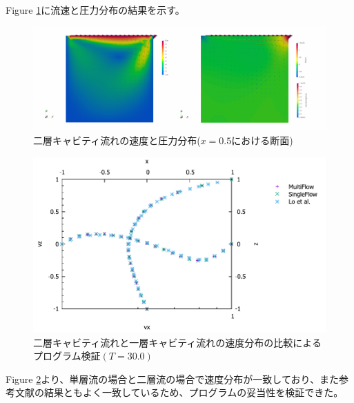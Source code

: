 Figure \ref{fig:3d-cavity-result-velocity-pressure}に流速と圧力分布の結果を示す。
\begin{figure}[H]
	\centering
	\includegraphics[width=18truecm]{pics/3d-cavity/velocity_pressure.pdf}
	\caption{二層キャビティ流れの速度と圧力分布($x=0.5$における断面)}
	\label{fig:3d-cavity-result-velocity-pressure}
\end{figure}

\begin{figure}[H]
	\centering
	\includegraphics[width=18truecm]{pics/3d-cavity/velocity_graph.pdf}
	\caption{二層キャビティ流れと一層キャビティ流れの速度分布の比較によるプログラム検証$(T=30.0)$}
	\label{fig:3d-cavity_velocity_graph}
\end{figure}

Figure \ref{fig:3d-cavity_velocity_graph}より、単層流の場合と二層流の場合で速度分布が一致しており、また参考文献\cite{Lo2005}の結果ともよく一致しているため、プログラムの妥当性を検証できた。